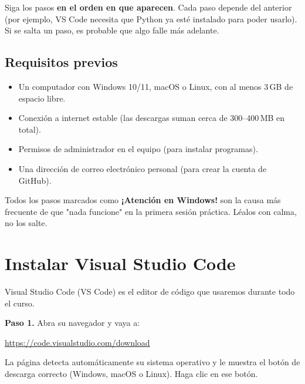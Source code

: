 \documentclass[11pt,a4paper]{article}
\newcommand{\link}[1]{\url{#1}}
\begin{document}
\begin{tip}
Siga los pasos \textbf{en el orden en que aparecen}. Cada paso depende del anterior (por ejemplo, VS Code necesita que Python ya esté instalado para poder usarlo). Si se salta un paso, es probable que algo falle más adelante.
\end{tip}

\subsection*{Requisitos previos}
\begin{itemize}
  \item Un computador con Windows 10/11, macOS o Linux, con al menos 3\,GB de espacio libre.
  \item Conexión a internet estable (las descargas suman cerca de 300--400\,MB en total).
  \item Permisos de administrador en el equipo (para instalar programas).
  \item Una dirección de correo electrónico personal (para crear la cuenta de GitHub).
\end{itemize}

\begin{crit}
Todos los pasos marcados como \textbf{¡Atención en Windows!} son la causa más frecuente de que "nada funcione" en la primera sesión práctica. Léalos con calma, no los salte.
\end{crit}

\section{Instalar Visual Studio Code}

Visual Studio Code (VS Code) es el editor de código que usaremos durante todo el curso.

\begin{stepbox}
\textbf{Paso 1.} Abra su navegador y vaya a:
\begin{center}\link{https://code.visualstudio.com/download}\end{center}
La página detecta automáticamente su sistema operativo y le muestra el botón de descarga correcto (Windows, macOS o Linux). Haga clic en ese botón.
\end{stepbox}
\end{document}
